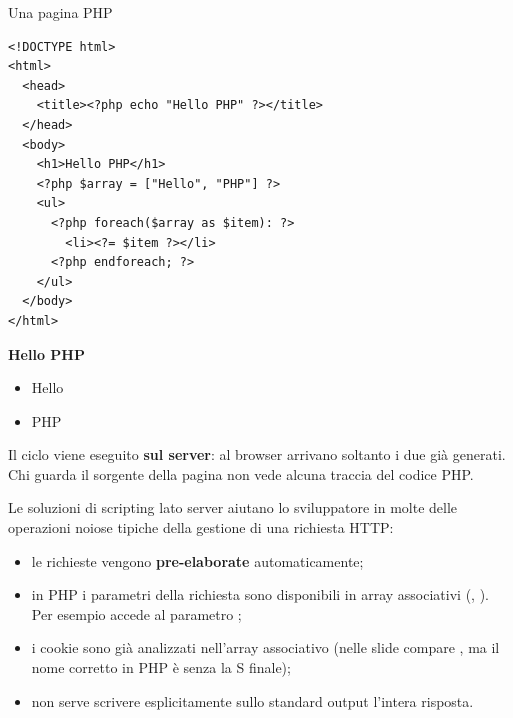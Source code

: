 \begin{esempio}{Una pagina PHP}
\begin{affianco}[0.55][c]
\begin{lstlisting}[style=php, name=hello-world.php]
<!DOCTYPE html>
<html>
  <head>
    <title><?php echo "Hello PHP" ?></title>
  </head>
  <body>
    <h1>Hello PHP</h1>
    <?php $array = ["Hello", "PHP"] ?>
    <ul>
      <?php foreach($array as $item): ?>
        <li><?= $item ?></li>
      <?php endforeach; ?>
    </ul>
  </body>
</html>
\end{lstlisting}
\risultato
\begin{browser}
  {\Lora\bfseries\Huge Hello PHP}\\[6pt]
  \begin{itemize}[leftmargin=1.8em, itemsep=0pt, topsep=2pt, parsep=0pt]
    \item Hello
    \item PHP
  \end{itemize}
\end{browser}
\end{affianco}

Il ciclo  viene eseguito \textbf{sul server}: al browser arrivano
soltanto i due  già generati. Chi guarda il sorgente della pagina non
vede alcuna traccia del codice PHP.
\end{esempio}

Le soluzioni di scripting lato server aiutano lo sviluppatore in molte delle
operazioni noiose tipiche della gestione di una richiesta HTTP:

\begin{itemize}
  \item le richieste vengono \textbf{pre-elaborate} automaticamente;
  \item in PHP i parametri della richiesta sono disponibili in array
        associativi (, ). Per esempio
         accede al parametro ;
  \item i cookie sono già analizzati nell'array associativo 
        (nelle slide compare , ma il nome corretto in PHP è
        senza la S finale);
  \item non serve scrivere esplicitamente sullo standard output l'intera
        risposta.
\end{itemize}

